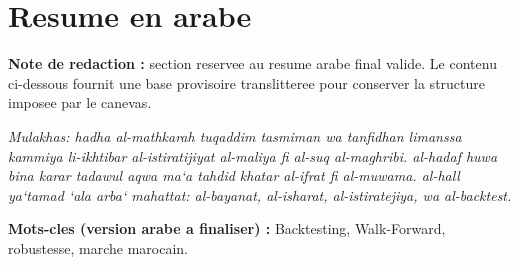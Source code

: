 \chapter*{Resume en arabe}

\textbf{Note de redaction :} section reservee au resume arabe final valide.
Le contenu ci-dessous fournit une base provisoire translitteree pour conserver
la structure imposee par le canevas.

\begin{flushright}
\textit{
Mulakhas: hadha al-mathkarah tuqaddim tasmiman wa tanfidhan limanssa
kammiya li-ikhtibar al-istiratijiyat al-maliya fi al-suq al-maghribi.
al-hadaf huwa bina karar tadawul aqwa ma`a tahdid khatar al-ifrat fi
al-muwama. al-hall ya`tamad `ala arba` mahattat: al-bayanat, al-isharat,
al-istiratejiya, wa al-backtest.
}
\end{flushright}

\textbf{Mots-cles (version arabe a finaliser) :}
Backtesting, Walk-Forward, robustesse, marche marocain.

\cleardoublepage


